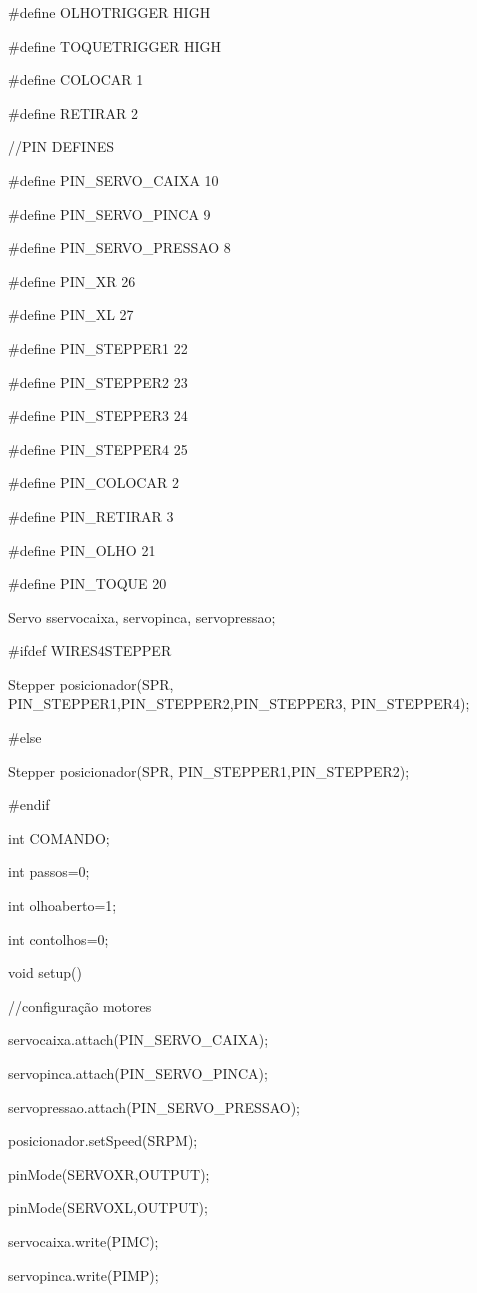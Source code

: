 \begin{apendicesenv}
\#define OLHOTRIGGER HIGH

\#define TOQUETRIGGER HIGH

\#define COLOCAR  1

\#define RETIRAR  2


//PIN DEFINES

\#define PIN\_SERVO\_CAIXA 10

\#define PIN\_SERVO\_PINCA 9

\#define PIN\_SERVO\_PRESSAO 8

\#define PIN\_XR 26

\#define PIN\_XL 27

\#define PIN\_STEPPER1 22

\#define PIN\_STEPPER2 23

\#define PIN\_STEPPER3 24

\#define PIN\_STEPPER4 25

\#define PIN\_COLOCAR 2        

\#define PIN\_RETIRAR 3      

\#define PIN\_OLHO  21

\#define PIN\_TOQUE 20



Servo sservocaixa, servopinca, servopressao;

\#ifdef WIRES4STEPPER

Stepper posicionador(SPR, PIN\_STEPPER1,PIN\_STEPPER2,PIN\_STEPPER3,
PIN\_STEPPER4);

\#else

Stepper posicionador(SPR, PIN\_STEPPER1,PIN\_STEPPER2);

\#endif

int COMANDO; 

int passos=0;

int olhoaberto=1;

int contolhos=0;

void setup(){
  
    //configuração motores

    servocaixa.attach(PIN\_SERVO\_CAIXA);

    servopinca.attach(PIN\_SERVO\_PINCA);

    servopressao.attach(PIN\_SERVO\_PRESSAO);

    posicionador.setSpeed(SRPM);

    pinMode(SERVOXR,OUTPUT);

    pinMode(SERVOXL,OUTPUT);

    servocaixa.write(PIMC);

    servopinca.write(PIMP);

}
\end{apendicesenv}
